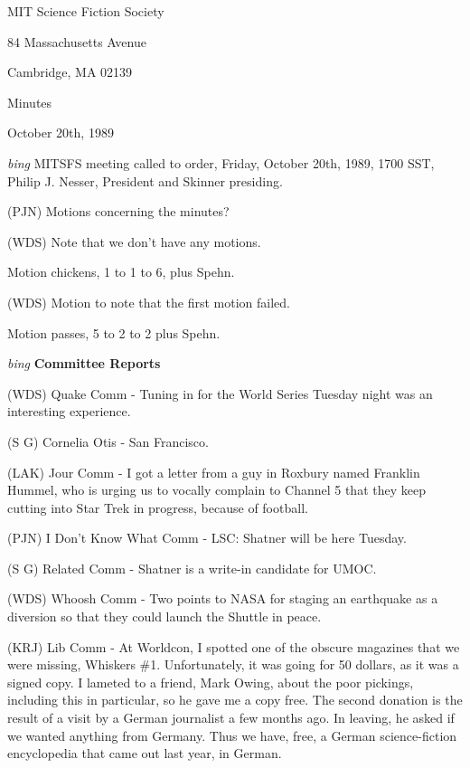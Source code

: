 \setlength{\topmargin}{-0.5in}
\setlength{\oddsidemargin}{-0.60in}
\setlength{\textheight}{9in}
\setlength{\textwidth}{6.5in}



\begin{center}
MIT Science Fiction Society

84 Massachusetts Avenue

Cambridge, MA 02139

\vspace{0.2in}
Minutes

October 20th, 1989

\end{center}
 
\vspace{0.15in}
{\em bing\/} MITSFS meeting called to order, Friday, October 20th, 1989,
1700 SST, Philip J. Nesser, President and Skinner presiding.

(PJN) Motions concerning the minutes?

(WDS) Note that we don't have any motions.

Motion chickens, 1 to 1 to 6, plus Spehn.

(WDS) Motion to note that the first motion failed.

Motion passes, 5 to 2 to 2 plus Spehn.

\vspace{0.15in}
{\em bing\/} {\bf Committee Reports}

(WDS) Quake Comm - Tuning in for the World Series Tuesday night was an
interesting experience.

(S G) Cornelia Otis - San Francisco.

(LAK) Jour Comm - I got a letter from a guy in Roxbury named Franklin
Hummel, who is urging us to vocally complain to Channel 5 that they
keep cutting into Star Trek in progress, because of football.

(PJN) I Don't Know What Comm - LSC: Shatner will be here Tuesday.

(S G) Related Comm - Shatner is a write-in candidate for UMOC.

(WDS) Whoosh Comm - Two points to NASA for staging an earthquake as a
diversion so that they could launch the Shuttle in peace.

(KRJ) Lib Comm - At Worldcon, I spotted one of the obscure magazines
that we were missing, Whiskers \#1.  Unfortunately, it was going for
50 dollars, as it was a signed copy.  I lameted to a friend, Mark Owing,
about the poor pickings, including this in particular, so he gave me a
copy free.  The second donation is the result of a visit by a German
journalist a few months ago.  In leaving, he asked if we wanted
anything from Germany.  Thus we have, free, a German science-fiction
encyclopedia that came out last year, in German.

